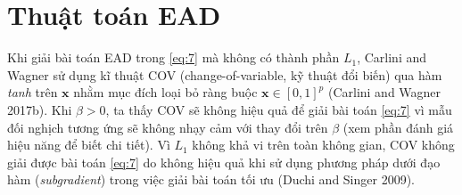 \section{Thuật toán EAD}
Khi giải bài toán EAD trong \ref{eq:7} mà không có thành phần $L_1$, Carlini and Wagner 
sử dụng kĩ thuật COV (change-of-variable, kỹ thuật đổi biến) qua hàm \textit{tanh} trên $\mathbf{x}$ nhằm 
mục đích loại bỏ ràng buộc $\mathbf{x} \in [0,1]^p$ (Carlini and Wagner 2017b). Khi 
$\beta > 0$, ta thấy COV sẽ không hiệu quả để giải bài toán \ref{eq:7} vì mẫu đối 
nghịch tương ứng sẽ không nhạy cảm với thay đổi trên $\beta$ (xem phần đánh giá hiệu 
năng để biết chi tiết). Vì $L_1$ không khả vi trên toàn không gian, COV không giải 
được bài toán \ref{eq:7} do không hiệu quả khi sử dụng phương pháp dưới đạo hàm (\textit{subgradient})
trong việc giải bài toán tối ưu (Duchi and Singer 2009). 

